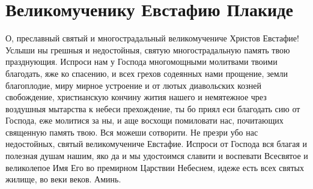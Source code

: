 \section{Великомученику Евстафию Плакиде}\begin{mymulticols}




О, преславный святый и многострадальный великомучениче Христов Евстафие! Услыши ны грешныя и недостойныя, святую многострадальную память твою празднующия. Испроси нам у Господа многомощными молитвами твоими благодать, яже ко спасению, и всех грехов содеянных нами прощение, земли благоплодие, миру мирное устроение и от лютых диавольских козней свобождение, христианскую кончину жития нашего и немятежное чрез воздушныя мытарства к небеси прехождение, ты бо приял еси благодать сию от Господа, еже молитися за ны, и аще восхощи помиловати нас, почитающих священную память твою. Вся можеши сотворити. Не презри убо нас недостойных, святый великомучениче Евстафие. Испроси от Господа вся благая и полезная душам нашим, яко да и мы удостоимся славити и воспевати Всесвятое и великолепое Имя Его во премирном Царствии Небеснем, идеже есть всех святых жилище, во веки веков. Аминь. 


\end{mymulticols}

\mychapterending





